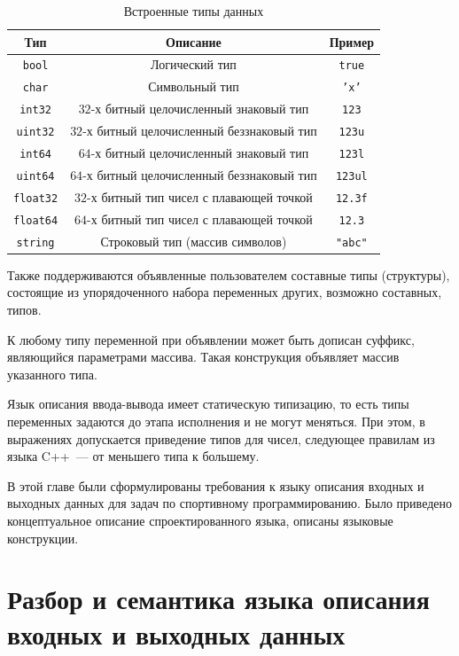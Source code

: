 \documentclass[times,specification,annotation]{style/itmo-student-thesis/itmo-student-thesis}
\begin{document}
\begin{table}[!h]
\caption{Встроенные типы данных}\label{predefined-types}
\centering
\begin{tabular}{|*{3}{c|}}\hline
Тип & Описание & Пример\\\hline
\texttt{bool} & Логический тип & \texttt{true} \\\hline
\texttt{char} & Символьный тип & \texttt{'x'}\\\hline
\texttt{int32} & $32$-х битный целочисленный знаковый тип & \texttt{123} \\\hline
\texttt{uint32} & $32$-х битный целочисленный беззнаковый тип & \texttt{123u} \\\hline
\texttt{int64} & $64$-х битный целочисленный знаковый тип & \texttt{123l} \\\hline
\texttt{uint64} & $64$-х битный целочисленный беззнаковый тип & \texttt{123ul} \\\hline
\texttt{float32} & $32$-х битный тип чисел с плавающей точкой & \texttt{12.3f} \\\hline
\texttt{float64} & $64$-х битный тип чисел с плавающей точкой & \texttt{12.3} \\\hline
\texttt{string} & Строковый тип (массив символов) & \texttt{"abc"} \\\hline
\end{tabular}
\end{table}

Также поддерживаются объявленные пользователем составные типы (структуры), состоящие из упорядоченного набора переменных других, возможно составных, типов.

К любому типу переменной при объявлении может быть дописан суффикс, являющийся параметрами массива. Такая конструкция объявляет массив указанного типа.

Язык описания ввода-вывода имеет статическую типизацию, то есть типы переменных задаются до этапа исполнения и не могут меняться. При этом, в выражениях допускается приведение типов для чисел, следующее правилам из языка C++~--- от меньшего типа к большему.

\chapterconclusion

В этой главе были сформулированы требования к языку описания входных и выходных данных для задач по спортивному программированию. Было приведено концептуальное описание спроектированного языка, описаны языковые конструкции.

\chapter{Разбор и семантика языка описания входных и выходных данных}
\end{document}
